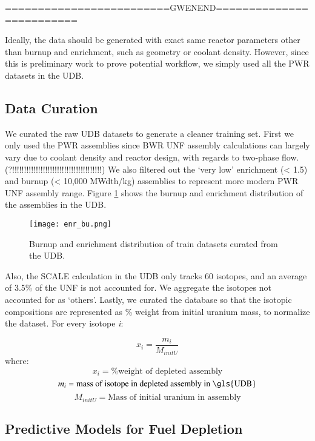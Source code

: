 =========================GWENEND=========================

Ideally, the data should be generated with exact same reactor
parameters other than burnup and enrichment, such as geometry or
coolant density. However, since
this is preliminary work to prove potential workflow, we
simply used all the \gls{PWR} datasets in the \gls{UDB}.

\subsection{Data Curation}

We curated the raw \gls{UDB} datasets to generate
a cleaner training set. First we only used the 
\gls{PWR} assemblies since \gls{BWR} \gls{UNF} assembly
calculations can largely vary due to coolant density
and reactor design, with regards to two-phase flow. 
(?!!!!!!!!!!!!!!!!!!!!!!!!!!!!!!!!!!!!!!)
We also filtered out the
`very low' enrichment (< 1.5) and burnup (< 10,000 MWdth/kg)
assemblies to represent more modern \gls{PWR} \gls{UNF}
assembly range. Figure \ref{fig:enr_bu} shows the
burnup and enrichment distribution of the assemblies in the
\gls{UDB}.


\begin{figure}
    \centering
    \texttt{[image: enr\_bu.png]}
    \caption{Burnup and enrichment distribution of train
             datasets curated from the \gls{UDB}.}
    \label{fig:enr_bu}
\end{figure}


Also, the SCALE calculation in the \gls{UDB} only tracks 60 isotopes,
and an average of 3.5\% of the \gls{UNF} is not accounted for. We
aggregate the isotopes not accounted for as `others'. Lastly,
we curated the database so that the isotopic compositions are 
represented as \% weight from initial uranium mass, to normalize
the dataset. For every isotope \textit{i}:

\begin{equation}
x_i = \frac{m_i}{M_{initU}}
\end{equation}
where:
\[
x_i = \text{\% weight of depleted assembly}
\]
\[
m_i = \text{mass of isotope in depleted assembly in \gls{UDB}}
\]
\[
M_{initU} = \text{Mass of initial uranium in assembly}
\]


\subsection{Predictive Models for Fuel Depletion}

